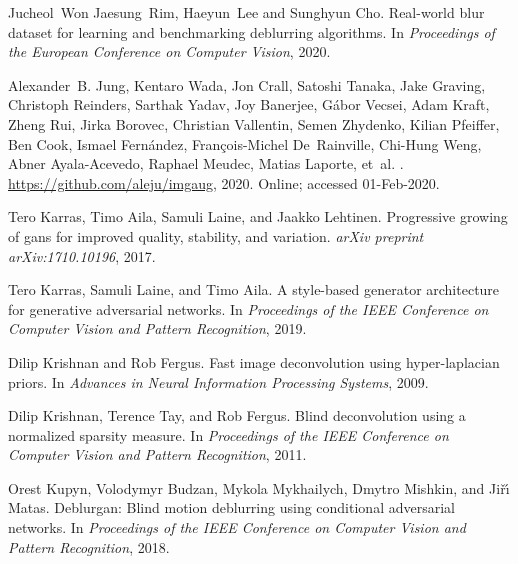 \documentclass[final]{cvpr}
\begin{document}
{\begin{thebibliography}{43}
Jucheol~Won Jaesung~Rim, Haeyun~Lee and Sunghyun Cho.
\newblock Real-world blur dataset for learning and benchmarking deblurring
  algorithms.
\newblock In \emph{Proceedings of the European Conference on Computer Vision},
  2020.

Alexander~B. Jung, Kentaro Wada, Jon Crall, Satoshi Tanaka, Jake Graving,
  Christoph Reinders, Sarthak Yadav, Joy Banerjee, Gábor Vecsei, Adam Kraft,
  Zheng Rui, Jirka Borovec, Christian Vallentin, Semen Zhydenko, Kilian
  Pfeiffer, Ben Cook, Ismael Fernández, François-Michel De~Rainville,
  Chi-Hung Weng, Abner Ayala-Acevedo, Raphael Meudec, Matias Laporte, et~al.
.
\newblock \url{https://github.com/aleju/imgaug}, 2020.
\newblock Online; accessed 01-Feb-2020.

Tero Karras, Timo Aila, Samuli Laine, and Jaakko Lehtinen.
\newblock Progressive growing of gans for improved quality, stability, and
  variation.
\newblock \emph{arXiv preprint arXiv:1710.10196}, 2017.

Tero Karras, Samuli Laine, and Timo Aila.
\newblock A style-based generator architecture for generative adversarial
  networks.
\newblock In \emph{Proceedings of the {IEEE} Conference on Computer Vision and
  Pattern Recognition}, 2019.

Dilip Krishnan and Rob Fergus.
\newblock Fast image deconvolution using hyper-laplacian priors.
\newblock In \emph{Advances in Neural Information Processing Systems}, 2009.

Dilip Krishnan, Terence Tay, and Rob Fergus.
\newblock Blind deconvolution using a normalized sparsity measure.
\newblock In \emph{Proceedings of the {IEEE} Conference on Computer Vision and
  Pattern Recognition}, 2011.

Orest Kupyn, Volodymyr Budzan, Mykola Mykhailych, Dmytro Mishkin, and
  Ji{\v{r}}{\'\i} Matas.
\newblock Deblurgan: Blind motion deblurring using conditional adversarial
  networks.
\newblock In \emph{Proceedings of the {IEEE} Conference on Computer Vision and
  Pattern Recognition}, 2018.


\end{thebibliography}}
\end{document}
